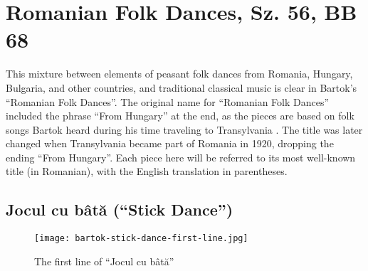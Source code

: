 \section{Romanian Folk Dances, Sz. 56, BB 68}

This mixture between elements of peasant folk dances from Romania, Hungary, Bulgaria, and other countries, and traditional classical music is clear in Bartok's ``Romanian Folk Dances''. The original name for ``Romanian Folk Dances'' included the phrase ``From Hungary'' at the end, as the pieces are based on folk songs Bartok heard during his time traveling to Transylvania \autocite{Burkholder_Grout_Palisca_2014}. The title was later changed when Transylvania became part of Romania in 1920, dropping the ending ``From Hungary''. Each piece here will be referred to its most well-known title (in Romanian), with the English translation in parentheses.

\subsection{Jocul cu bâtă (``Stick Dance'')}

\begin{figure}
  \centering
  \texttt{[image: bartok-stick-dance-first-line.jpg]}
  \caption[The first line of ``Jocul cu bâtă'' of Bartok's \textit{Romanian Folk Dances} Sz. 56, BB 68]{The first line of ``Jocul cu bâtă''}
  \label{fig:bartok-stick-dance-first-line}
\end{figure}


